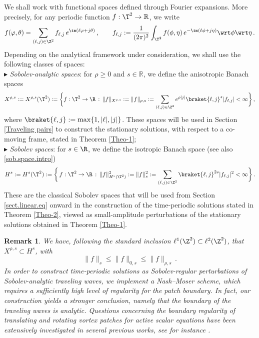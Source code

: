 \documentclass[a4paper,reqno,10pt]{article}
\newtheorem{rem}{Remark}[section]
\begin{document}
We shall work with functional spaces defined through Fourier expansions. More precisely, for any periodic function $f:\T^2 \to \mathbb{R}$, we write
\begin{equation}
f(\varphi,\theta) = \sum_{(\ell,j)\in \Z^2} f_{\ell,j} \, e^{\im(\ell \varphi + j \theta)} \,,  
\qquad 
f_{\ell,j}:= \frac{1}{(2\pi)^{2}}\int_{\T^2} f(\phi,\eta)\, e^{-\im(\ell\phi + j\eta)} \wrt \phi \wrt \eta \,.
\end{equation}
Depending on the analytical framework under consideration, we shall use the following classes of spaces:
\\[1mm]
\noindent $\blacktriangleright$ {\it Sobolev-analytic spaces}: for $\rho\geq 0$ and $s\in\mathbb{R}$, we define the anisotropic Banach spaces
\begin{equation}\label{X.space}
		 X^{\rho,s}:= X^{\rho,s}(\T^2):=\bigg\{ f:\T^2 \to \R \, :\,  \| f\|_{X^{\rho,s}} :=  \| f \|_{\rho,s}  := \sum_{(\ell,j)\in \Z^2} e^{\rho|j|} \braket{\ell,j}^s |f_{\ell,j}| < \infty  \bigg\}\,,   
\end{equation}
where $\braket{\ell,j}:={\rm max}\{1,|\ell|,|j|\}$. These spaces will be used in  Section \ref{Traveling pairs} to construct the stationary solutions, with respect to  a co-moving frame, stated in Theorem \ref{Theo-1};
\\[1mm]
\noindent $\blacktriangleright$ {\it Sobolev spaces}: for $s\in \R$, we define the isotropic Banach space (see also \eqref{sob.space.intro})
\begin{equation}\label{sob.space}
	H^s:= H^s(\T^2) := \bigg\{\, f:\T^2 \to \R   \, : \, \| f \|_{H^s(\T^2)}^2 :=  \| f \|_{s}^2  := \sum_{(\ell,j)\in \Z^2} \braket{\ell,j}^{2s} |f_{\ell,j}|^2 < \infty  \bigg\}\,.  
\end{equation}
These are the classical Sobolev spaces that will be used from Section \ref{sect.linear.eq} onward in the construction of the time-periodic solutions stated in Theorem \ref{Theo-2}, viewed as small-amplitude perturbations of the stationary solutions obtained in Theorem \ref{Theo-1}.
\begin{rem}
We have, following the standard inclusion $\ell^1(\Z^2) \subset \ell ^2(\Z^2)$, that $X^{\rho,s}\subset H^s$, with
\begin{equation}
    \| f \|_{s} \leq \| f \|_{0,s} \leq \| f \|_{\rho,s} \,.
\end{equation}
In order to construct time-periodic solutions as Sobolev-regular perturbations of Sobolev-analytic traveling waves, we implement a Nash--Moser scheme, which requires a sufficiently high level of regularity for the patch boundary. In fact, our construction yields a stronger conclusion, namely that the boundary of the traveling waves is analytic. Questions concerning the boundary regularity of translating and rotating vortex patches for active scalar equations have been extensively investigated in several previous works, see for instance \cite{Casrro,GH23,HMW20,HMV}.
\end{rem}
\end{document}
